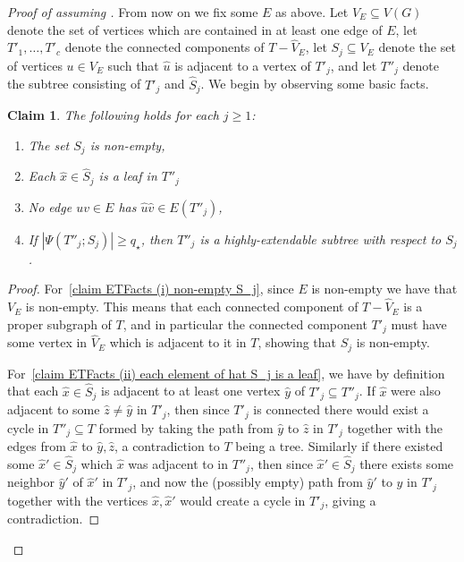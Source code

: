 \documentclass[12pt,letterpaper]{article}
\newtheorem{claim}[theorem]{Claim}
\theoremstyle{definition}
\newcommand{\Pow}{{q_\star}} %
\newcommand{\sub}{\subseteq}
\begin{document}
\begin{proof}[Proof of  assuming ]
		From now on we fix some $E$ as above.	Let $V_E\sub V(G)$ denote the set of vertices which are contained in at least one edge of $E$, let $T'_1,\ldots,T'_c$ denote the connected components of $T-\widehat{V}_E$, let $S_j\sub V_E$ denote the set of vertices $u\in V_E$ such that $\hat{u}$ is adjacent to a vertex of $T'_j$, and let $T''_j$ denote the subtree consisting of $T'_j$ and $\widehat{S}_j$.   We begin by observing some basic facts.
		
		\begin{claim}\label{cl:ETFacts}
			The following holds for each $j\ge 1$:
			\begin{enumerate}[label=(\roman*)]
				\item The set $S_j$ is non-empty,\label{claim ETFacts (i) non-empty S_j}
				\item Each $\hat{x}\in \widehat{S}_j$ is a leaf in $T''_j$\label{claim ETFacts (ii) each element of hat S_j is a leaf}
				\item No edge $uv\in E$ has $\hat{u}\hat{v}\in E(T''_j)$,\label{claim ETFacts (iii) no edge is in E(T''_j)}
				\item If $|\Psi(T''_j;S_j)|\ge \Pow$, then $T''_j$ is a highly-extendable subtree with respect to $S_j$.\label{claim ETFacts (iv) highly extentable}
			\end{enumerate}
		\end{claim}
		\begin{proof}
			For~\ref{claim ETFacts (i) non-empty S_j}, since $E$ is non-empty we have that $V_E$ is non-empty.  This means that each connected component of $T-\widehat{V}_E$ is a proper subgraph of $T$, and in particular the connected component $T'_j$ must have some vertex in $\widehat{V}_E$ which is adjacent to it in $T$, showing that $S_j$ is non-empty. 
			
			
			For~\ref{claim ETFacts (ii) each element of hat S_j is a leaf}, we have by definition that each $\hat{x}\in \widehat{S}_j$ is adjacent to at least one vertex $\hat{y}$ of $T'_j\sub T''_j$.  If $\hat{x}$ were also adjacent to some $\hat{z}\ne \hat{y}$ in $T'_j$, then since $T'_j$ is connected there would exist a cycle in $T''_j\sub T$ formed by taking the path from $\hat{y}$ to $\hat{z}$ in $T'_j$ together with the edges from $\hat{x}$ to $\hat{y},\hat{z}$, a contradiction to $T$ being a tree.  Similarly if there existed some $\hat{x}'\in \widehat{S}_j$ which $\hat{x}$ was adjacent to in $T''_j$, then since $\hat{x}'\in \widehat{S}_j$ there exists some neighbor $\hat{y}'$ of $\hat{x}'$ in $T'_j$, and now the (possibly empty) path from $\hat{y}'$ to $\hat{y}$ in $T'_j$ together with the vertices $\hat{x},\hat{x}'$ would create a cycle in $T'_j$, giving a contradiction.
			

\end{proof}
\end{proof}
\end{document}

